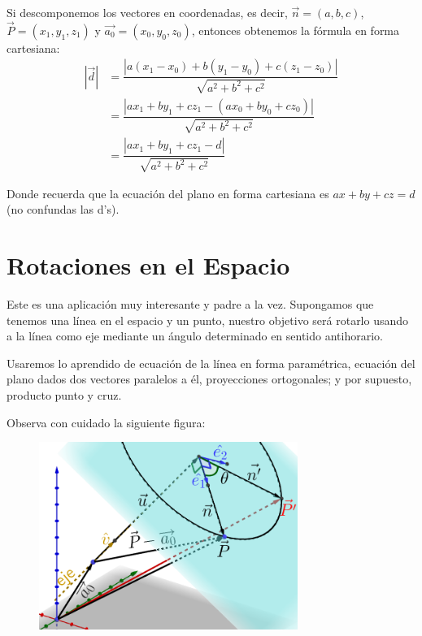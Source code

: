 \documentclass[12pt, fleqn]{report}                             %
\def \Eq {equation}                                             %
\newenvironment{MultiLineEquation}[1]                           %
        {\begin{\Eq}\begin{alignedat}{#1}}                          %
        {\end{alignedat}\end{\Eq}}                                  %
\theoremstyle{break}                                            %
\newcommand{\abs}[1]    {\left\lvert #1 \right\lvert}           %
\newcommand{\lVec}[1]   {\overrightarrow{#1}}                   %
\begin{document}
                Si descomponemos los vectores en coordenadas, es decir, 
                $\vec{n} = (a,b,c)$, $\vec{P} = (x_1, y_1, z_1)$ y $\lVec{a_0}=(x_0, y_0, z_0)$,
                entonces obtenemos la fórmula en forma cartesiana:
                \begin{MultiLineEquation}{3}
                    \abs{\vec{d}}
                        &= \dfrac{\abs{a(x_1 - x_0) + b(y_1 - y_0) + c(z_1 - z_0)}}{\sqrt{a^2+b^2+c^2}} \\
                        &= \dfrac{\abs{ax_1 + by_1 + cz_1 - (ax_0 + by_0 + cz_0)}}{\sqrt{a^2+b^2+c^2}}  \\
                        &= \dfrac{\abs{ax_1 + by_1 + cz_1 - d}}{\sqrt{a^2+b^2+c^2}}
                        \label{distancePointPlane2}
                \end{MultiLineEquation}

                Donde recuerda que la ecuación del plano en forma cartesiana es 
                $ax + by + cz = d$ (no confundas las d's).
                


        \clearpage
        \section{Rotaciones en el Espacio}
            
            Este es una aplicación muy interesante y padre a la vez.
            Supongamos que tenemos una línea en el espacio y un punto, nuestro objetivo será rotarlo
            usando a la línea como eje mediante un ángulo determinado en sentido antihorario.
            
            Usaremos lo aprendido de ecuación de la línea en forma paramétrica, ecuación del plano dados
            dos vectores paralelos a él, proyecciones ortogonales; y por supuesto, producto punto y cruz.
            
            Observa con cuidado la siguiente figura:
            \begin{figure}[H]
                \centering
                \includegraphics[width=0.75\textwidth]{rotation}
            \end{figure}
        
\end{document}

